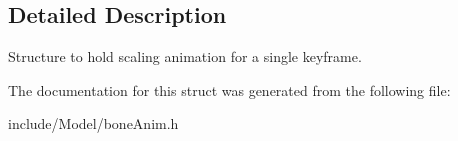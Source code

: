 \subsection{Detailed Description}
Structure to hold scaling animation for a single keyframe. 

The documentation for this struct was generated from the following file\+:\begin{DoxyCompactItemize}
\item 
include/\+Model/bone\+Anim.\+h\end{DoxyCompactItemize}
